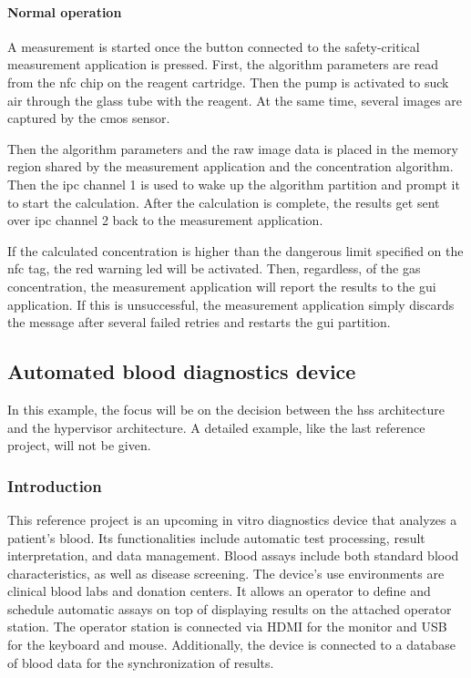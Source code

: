 \paragraph{Normal operation}
A measurement is started once the button connected to the safety-critical measurement application is pressed. First, the algorithm parameters are read from the \acrshort{nfc} chip on the reagent cartridge. Then the pump is activated to suck air through the glass tube with the reagent. At the same time, several images are captured by the \acrshort{cmos} sensor.

Then the algorithm parameters and the raw image data is placed in the memory region shared by the measurement application and the concentration algorithm. Then the \acrshort{ipc} channel 1 is used to wake up the algorithm partition and prompt it to start the calculation. After the calculation is complete, the results get sent over \acrshort{ipc} channel 2 back to the measurement application. 

If the calculated concentration is higher than the dangerous limit specified on the \acrshort{nfc} tag, the red warning \acrshort{led} will be activated. Then, regardless, of the gas concentration, the measurement application will report the results to the \acrshort{gui} application. If this is unsuccessful, the measurement application simply discards the message after several failed retries and restarts the \acrshort{gui} partition.

\subsection{Automated blood diagnostics device}
In this example, the focus will be on the decision between the \acrshort{hss} architecture and the hypervisor architecture. A detailed example, like the last reference project, will not be given.
\subsubsection{Introduction}
This reference project is an upcoming in vitro diagnostics device that analyzes a patient's blood. Its functionalities include automatic test processing, result interpretation, and data management. Blood assays include both standard blood characteristics, as well as disease screening.
The device's use environments are clinical blood labs and donation centers. It allows an operator to define and schedule automatic assays on top of displaying results on the attached operator station. The operator station is connected via HDMI for the monitor and USB for the keyboard and mouse. Additionally, the device is connected to a database of blood data for the synchronization of results.

